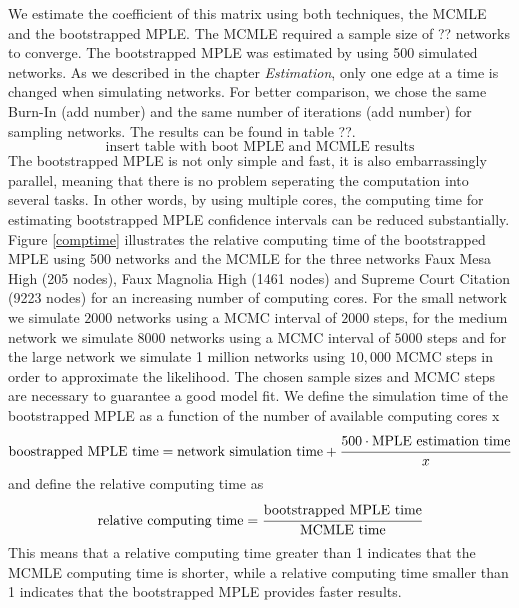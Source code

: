 \documentclass[headsepline=true, abstracton]{scrartcl}
\begin{document}
We estimate the coefficient of this matrix using both techniques, the MCMLE and the bootstrapped MPLE. The MCMLE required a sample size of ?? networks to converge. The bootstrapped MPLE was estimated by using 500 simulated networks. As we described in the chapter {\it Estimation}, only one edge at a time is changed when simulating networks. For better comparison, we chose the same Burn-In (add number) and the same number of iterations (add number) for sampling networks. The results can be found in table ??.
\\[0.3cm]
$$\text{insert table with boot MPLE and MCMLE results}$$
The bootstrapped MPLE is not only simple and fast, it is also embarrassingly parallel, meaning that there is no problem seperating the computation into several tasks. In other words, by using multiple cores, the computing time for estimating bootstrapped MPLE confidence intervals can be reduced substantially. Figure \ref{comptime} illustrates the relative computing time of the bootstrapped MPLE using 500 networks and the MCMLE for the three networks Faux Mesa High (205 nodes), Faux Magnolia High (1461 nodes) and Supreme Court Citation (9223 nodes) for an increasing number of computing cores. For the small network we simulate $2000$ networks using a MCMC interval of $2000$ steps, for the medium network we simulate $8000$ networks using a MCMC interval of $5000$ steps and for the large network we simulate 1 million networks using $10,000$ MCMC steps in order to approximate the likelihood. The chosen sample sizes and MCMC steps are necessary to guarantee a good model fit. We define the simulation time of the bootstrapped MPLE as a function of the number of available computing cores x
$$\text{boostrapped MPLE time} = \text{network simulation time} + \cfrac{500 \cdot \text{MPLE estimation time}}{x}$$     
and define the relative computing time as
$$\text{relative computing time}= \cfrac{\text{bootstrapped MPLE time}}{\text{MCMLE time}}$$
This means that a relative computing time greater than 1 indicates that the MCMLE computing time is shorter, while a relative computing time smaller than 1 indicates that the bootstrapped MPLE provides faster results. 
\end{document}
